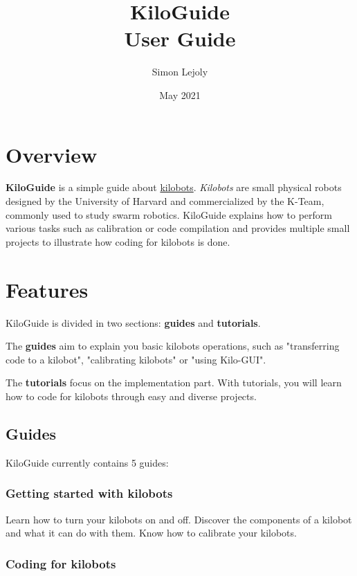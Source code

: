\documentclass[a4paper,12pt,titlepage]{scrartcl}
\title{\textbf{KiloGuide}\\User Guide}
\author{Simon Lejoly}
\date{May 2021}
\begin{document}
\maketitle

\newpage

\tableofcontents

\newpage

\section{Overview}

\textbf{KiloGuide} is a simple guide about \href{https://kilobotics.com}{kilobots}. \emph{Kilobots} are small physical robots designed by the University of Harvard and commercialized by the K-Team, commonly used to study swarm robotics. KiloGuide explains how to perform various tasks such as calibration or code compilation and provides multiple small projects to illustrate how coding for kilobots is done.

\section{Features}

KiloGuide is divided in two sections: \textbf{guides} and \textbf{tutorials}.

The \textbf{guides} aim to explain you basic kilobots operations, such as "transferring code to a kilobot", "calibrating kilobots" or "using Kilo-GUI".

The \textbf{tutorials} focus on the implementation part. With tutorials, you will learn how to code for kilobots through easy and diverse projects.

\subsection{Guides}

KiloGuide currently contains 5 guides: 

\subsubsection{Getting started with kilobots}

Learn how to turn your kilobots on and off. Discover the components of a kilobot and what it can do with them. Know how to calibrate your kilobots.

\subsubsection{Coding for kilobots}
\end{document}
